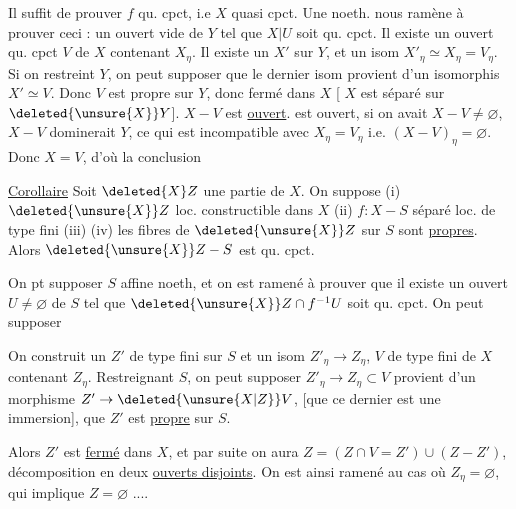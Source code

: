  Il suffit de prouver $f$ qu. cpct, i.e $X$ quasi cpct.
Une  noeth.   nous
ramène à prouver ceci : 
un ouvert  vide de $Y$ tel que $X|U$ soit
qu. cpct.  Il existe un ouvert qu. cpct $V$ de $X$  contenant $X_\eta$. Il existe un
$X'$  sur $Y$, et un isom
$X'_\eta\simeq X_\eta=V_\eta$. Si on restreint $Y$, on peut
supposer que le dernier isom provient
d'un isomorphis $X'\simeq V$. Donc 
$V$ est propre sur $Y$, donc fermé dans $X$ [ $X$ est
séparé sur $\deleted{\unsure{X}}Y$].  
 $X-V$ est \uline{ouvert}. 
 est ouvert, 
si on avait $X-V\ne\varnothing$, $X-V$ dominerait $Y$,
 ce qui est incompatible avec $X_\eta=V_\eta$
i.e. $(X-V)_\eta=\varnothing$. Donc $X=V$, d'où la conclusion

\uline{Corollaire} Soit $\deleted{X}Z$ une partie de $X$. On
suppose (i) $\deleted{\unsure{X}}Z$ loc. constructible dans $X$
(ii) $f:X-S$ séparé loc. de type fini (iii) 
 (iv) les fibres de
$\deleted{\unsure{X}}Z$ sur $S$ sont \uline{propres}. Alors $\deleted{\unsure{X}}Z-S$ est
qu. cpct.

On pt supposer $S$ affine  noeth, et on est
ramené à prouver que  il existe un ouvert $U\ne\varnothing$
de $S$ tel que $\deleted{\unsure{X}}Z\cap f^{-1}U$ soit qu. cpct. On peut supposer

On construit un $Z'$ de type fini sur $S$ et un
isom $Z'_\eta\to Z_\eta$,  
$V$ de type fini de $X$ contenant $Z_\eta$. Restreignant $S$,
on peut supposer $Z'_\eta\to Z_\eta\subset V$ provient d'un
morphisme $Z'\to\deleted{\unsure{X|Z}}V$, [que ce dernier est
une immersion],  que $Z'$ est \uline{propre} sur $S$.

Alors $Z'$ est \uline{fermé} dans $X$, et par suite on
aura $Z=(Z\cap V=Z')\cup(Z-Z')$, décomposition
 en deux \uline{ouverts  disjoints}. On est
ainsi ramené au cas où $Z_\eta=\varnothing$,
qui implique $Z=\varnothing$ ....
